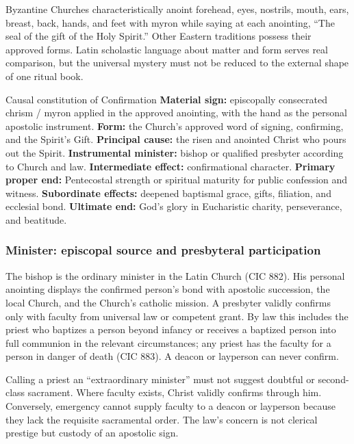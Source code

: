 Byzantine Churches characteristically anoint forehead, eyes, nostrils, mouth, ears, breast, back, hands, and feet with myron while saying at each anointing, ``The seal of the gift of the Holy Spirit.'' Other Eastern traditions possess their approved forms. Latin scholastic language about matter and form serves real comparison, but the universal mystery must not be reduced to the external shape of one ritual book.

\begin{massbox}{Causal constitution of Confirmation}
\textbf{Material sign:} episcopally consecrated chrism / myron applied in the approved anointing, with the hand as the personal apostolic instrument. \textbf{Form:} the Church's approved word of signing, confirming, and the Spirit's Gift. \textbf{Principal cause:} the risen and anointed Christ who pours out the Spirit. \textbf{Instrumental minister:} bishop or qualified presbyter according to Church and law. \textbf{Intermediate effect:} confirmational character. \textbf{Primary proper end:} Pentecostal strength or spiritual maturity for public confession and witness. \textbf{Subordinate effects:} deepened baptismal grace, gifts, filiation, and ecclesial bond. \textbf{Ultimate end:} God's glory in Eucharistic charity, perseverance, and beatitude.
\end{massbox}

\subsubsection{Minister: episcopal source and presbyteral participation}

The bishop is the ordinary minister in the Latin Church (CIC 882). His personal anointing displays the confirmed person's bond with apostolic succession, the local Church, and the Church's catholic mission. A presbyter validly confirms only with faculty from universal law or competent grant. By law this includes the priest who baptizes a person beyond infancy or receives a baptized person into full communion in the relevant circumstances; any priest has the faculty for a person in danger of death (CIC 883). A deacon or layperson can never confirm.

Calling a priest an ``extraordinary minister'' must not suggest doubtful or second-class sacrament. Where faculty exists, Christ validly confirms through him. Conversely, emergency cannot supply faculty to a deacon or layperson because they lack the requisite sacramental order. The law's concern is not clerical prestige but custody of an apostolic sign.

